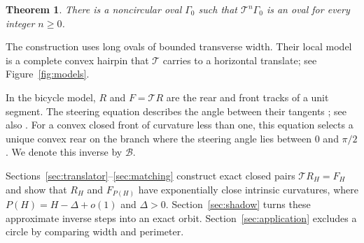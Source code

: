\documentclass[11pt]{article}
\numberwithin{equation}{section}
\newtheorem{theorem}{Theorem}[section]
\newcommand{\Tmap}{\mathcal T}
\newcommand{\Bmap}{\mathcal B}
\begin{document}
\begin{theorem}\label{thm:main}
There is a noncircular oval \(\Gamma_0\) such that \(\Tmap^n\Gamma_0\) is an
oval for every integer \(n\geq0\).
\end{theorem}

The construction uses long ovals of bounded transverse width. Their local
model is a complete convex hairpin that \(\Tmap\) carries to a horizontal
translate; see Figure~\ref{fig:models}.

In the bicycle model, \(R\) and \(F=\Tmap R\) are the rear and front
tracks of a unit segment. The steering equation describes the angle
between their tangents \cite[Section~2]{LeviTabachnikov}; see also
\cite[Proposition~2.6]{BorLeviPerlineTabachnikov2020}. For a convex closed
front of curvature less than one, this equation selects a unique convex rear
on the branch where the steering angle lies between \(0\) and \(\pi/2\).
We denote this inverse by \(\Bmap\).

Sections~\ref{sec:translator}--\ref{sec:matching} construct exact closed
pairs \(\Tmap R_H=F_H\) and show that \(R_H\) and \(F_{P(H)}\) have
exponentially close intrinsic curvatures, where
\(P(H)=H-\Delta+o(1)\) and \(\Delta>0\). Section~\ref{sec:shadow} turns
these approximate inverse steps into an exact orbit. Section~\ref{sec:application}
excludes a circle by comparing width and perimeter.
\end{document}
